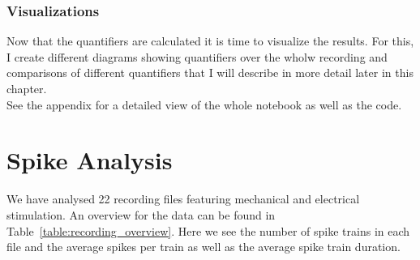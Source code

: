 \subsubsection{Visualizations}
Now that the quantifiers are calculated it is time to visualize the results. For this, I create different diagrams showing quantifiers over the wholw recording and comparisons of different quantifiers that I will describe in more detail later in this chapter.\\
See the appendix for a detailed view of the whole notebook as well as the code.


\section{Spike Analysis}


We have analysed 22 recording files featuring  mechanical and electrical stimulation. An overview for the data can be found in  Table~\ref{table:recording_overview}. Here we see the number of spike trains in each file and the average spikes per train as well as the average spike train duration.

